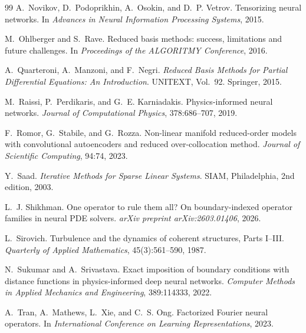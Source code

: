 \documentclass{article}
\begin{document}
\begin{thebibliography}{99}
A.~Novikov, D.~Podoprikhin, A.~Osokin, and D.~P. Vetrov.
\newblock Tensorizing neural networks.
\newblock In \emph{Advances in Neural Information Processing Systems},
2015.

M.~Ohlberger and S.~Rave.
\newblock Reduced basis methods: success, limitations and future
challenges.
\newblock In \emph{Proceedings of the ALGORITMY Conference}, 2016.

A.~Quarteroni, A.~Manzoni, and F.~Negri.
\newblock \emph{Reduced Basis Methods for Partial Differential
Equations: An Introduction}.
\newblock UNITEXT, Vol.~92. Springer, 2015.

M.~Raissi, P.~Perdikaris, and G.~E. Karniadakis.
\newblock Physics-informed neural networks.
\newblock \emph{Journal of Computational Physics}, 378:686--707, 2019.

F.~Romor, G.~Stabile, and G.~Rozza.
\newblock Non-linear manifold reduced-order models with convolutional
autoencoders and reduced over-collocation method.
\newblock \emph{Journal of Scientific Computing}, 94:74, 2023.

Y.~Saad.
\newblock \emph{Iterative Methods for Sparse Linear Systems}.
\newblock SIAM, Philadelphia, 2nd edition, 2003.

L.~J. Shikhman.
\newblock One operator to rule them all? On boundary-indexed operator
families in neural PDE solvers.
\newblock \emph{arXiv preprint arXiv:2603.01406}, 2026.

L.~Sirovich.
\newblock Turbulence and the dynamics of coherent structures, Parts
I--III.
\newblock \emph{Quarterly of Applied Mathematics}, 45(3):561--590, 1987.

N.~Sukumar and A.~Srivastava.
\newblock Exact imposition of boundary conditions with distance
functions in physics-informed deep neural networks.
\newblock \emph{Computer Methods in Applied Mechanics and Engineering},
389:114333, 2022.

A.~Tran, A.~Mathews, L.~Xie, and C.~S. Ong.
\newblock Factorized Fourier neural operators.
\newblock In \emph{International Conference on Learning Representations},
2023.


\end{thebibliography}
\end{document}
